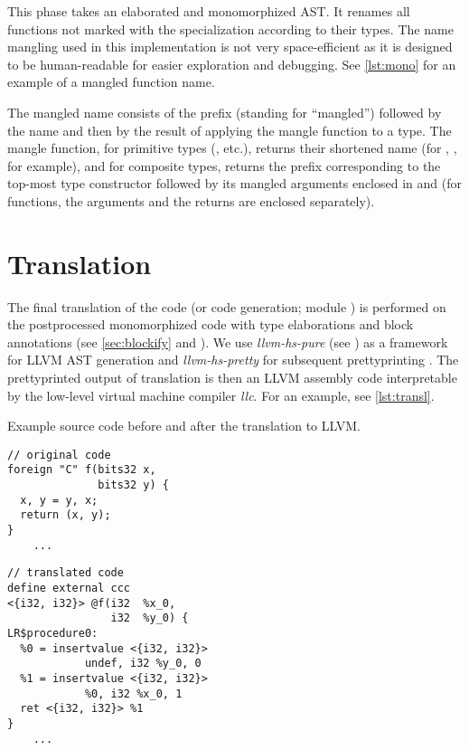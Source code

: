This phase takes an elaborated and monomorphized AST. It renames all functions not marked with the  specialization according to their types. The name mangling used in this implementation is not very space-efficient as it is designed to be human-readable for easier exploration and debugging. See \cref{lst:mono} for an example of a mangled function name.

\begin{defn}
    The mangled name consists of the  prefix (standing for ``mangled'') followed by the name and then by the result of applying the mangle function to a type. The mangle function, for primitive types (, etc.), returns their shortened name (for , , for example), and for composite types, returns the prefix corresponding to the top-most type constructor followed by its mangled arguments enclosed in  and  (for functions, the arguments and the returns are enclosed separately).
\end{defn}

\section{Translation}
\label{translation}

The final translation of the code (or code generation; module ) is performed on the postprocessed monomorphized code with type elaborations and block annotations (see \cref{sec:blockify} and ). We use \emph{llvm-hs-pure} (see \cite{llvmHSpure}) as a framework for LLVM AST generation and \emph{llvm-hs-pretty} for subsequent prettyprinting \cite{llvmHSpretty}. The prettyprinted output of translation is then an LLVM assembly code interpretable by the low-level virtual machine compiler \emph{llc}. For an example, see \cref{lst:transl}.

\begin{codex}
    \caption{Example source code before and after the translation to LLVM.}
    \label{lst:transl}
    \begin{center}
    \begin{minipage}{0.5\linewidth}
    \begin{lstlisting}
// original code
foreign "C" f(bits32 x,
              bits32 y) {
  x, y = y, x;
  return (x, y);
}
    ...\end{lstlisting}
    \end{minipage}%
    \begin{minipage}{0.5\linewidth}
    \begin{lstlisting}
// translated code
define external ccc
<{i32, i32}> @f(i32  %x_0,
                i32  %y_0) {
LR$procedure0:
  %0 = insertvalue <{i32, i32}>
            undef, i32 %y_0, 0
  %1 = insertvalue <{i32, i32}>
            %0, i32 %x_0, 1
  ret <{i32, i32}> %1
}
    ...\end{lstlisting}
    \end{minipage}
    \end{center}
\end{codex}

